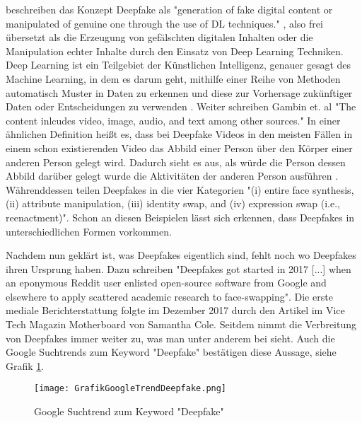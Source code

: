 \textcite{gambinDeepfakesCurrentFuture2024} beschreiben das Konzept Deepfake als "generation of fake digital content or manipulated of genuine one through the use of DL techniques." \cite[S. ?]{gambinDeepfakesCurrentFuture2024},
also frei übersetzt als die Erzeugung von gefälschten digitalen Inhalten oder die Manipulation echter Inhalte durch den Einsatz von Deep Learning Techniken. 
Deep Learning ist ein Teilgebiet der Künstlichen Intelligenz, genauer gesagt des Machine Learning, in dem es darum geht, mithilfe einer Reihe von Methoden automatisch Muster in Daten zu erkennen und diese zur Vorhersage zukünftiger Daten oder Entscheidungen zu verwenden \autocite[S. 1]{murphyMachineLearningProbabilistic2012} . 
Weiter schreiben Gambin et. al "The content inlcudes video, image, audio, and text among other sources." 
In einer ähnlichen Definition heißt es, dass bei Deepfake Videos in den meisten Fällen in einem schon existierenden Video das Abbild einer Person über den Körper einer anderen Person gelegt wird. 
Dadurch sieht es aus, als würde die Person dessen Abbild darüber gelegt wurde die Aktivitäten der anderen Person ausführen \autocite{harrisVideoDemandWhat2021}.
Währenddessen teilen \textcite{juefei-xuCounteringMaliciousDeepFakes2022} Deepfakes in die vier Kategorien "(i) entire face synthesis, (ii) attribute manipulation, (iii) identity swap, and (iv) expression swap (i.e., reenactment)". 
Schon an diesen Beispielen lässt sich erkennen, dass Deepfakes in unterschiedlichen Formen vorkommen.

Nachdem nun geklärt ist, was Deepfakes eigentlich sind, fehlt noch wo Deepfakes ihren Ursprung haben. 
Dazu schreiben \textcite{kernerPornDiscreditationEpistemic2021} "Deepfakes got started in 2017 [...] when an eponymous Reddit user enlisted open-source software from Google and elsewhere to apply scattered academic research to face-swapping". 
Die erste mediale Berichterstattung folgte im Dezember 2017 durch den Artikel \textcite{AIAssistedFakePorn2017} im Vice Tech Magazin Motherboard von Samantha Cole.
Seitdem nimmt die Verbreitung von Deepfakes immer weiter zu, was man unter anderem bei \textcite{ranaDeepfakeDetectionSystematic2022,westerlundEmergenceDeepfakeTechnology2019,gamagePDFEmergenceDeepfakes} sieht. 
Auch die Google Suchtrends zum Keyword "Deepfake" bestätigen diese Aussage, siehe Grafik \ref{fig:suchtrend-grafik}.
\begin{figure} [htbp]
    \centering
    \texttt{[image: GrafikGoogleTrendDeepfake.png]}
    \caption{Google Suchtrend zum Keyword "Deepfake"}
    \label{fig:suchtrend-grafik}
\end{figure}

